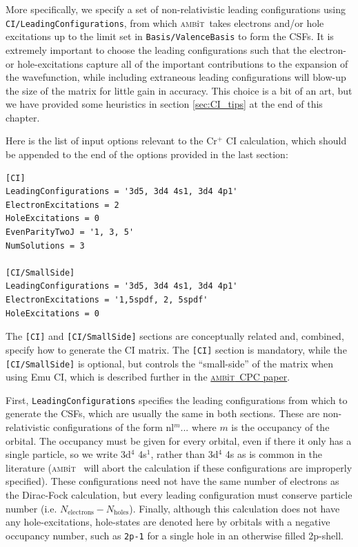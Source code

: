 \documentclass{report}
\newcommand{\ambit}{\textsc{amb}{\footnotesize i}\textsc{t}}
\begin{document}
More specifically, we specify a set of non-relativistic leading configurations using 
\texttt{CI/LeadingConfigurations}, from which \ambit\  takes electrons and/or hole excitations up to the
limit set in \texttt{Basis/ValenceBasis} to form the CSFs. It is extremely important to choose the
leading configurations such that the electron- or hole-excitations capture all of the important
contributions to the expansion of the wavefunction, while including extraneous leading configurations
will blow-up the size of the matrix for little gain in accuracy. This choice is a bit of an art, but we
have provided some heuristics in section \ref{sec:CI_tips} at the end of this chapter.

Here is the list of input options relevant to the Cr$^+$ CI calculation, which should be appended to the
end of the options provided in the last section:

\begin{verbatim}
[CI]                                                                           
LeadingConfigurations = '3d5, 3d4 4s1, 3d4 4p1'                                
ElectronExcitations = 2                                                        
HoleExcitations = 0                                                            
EvenParityTwoJ = '1, 3, 5'                                                     
NumSolutions = 3
                                                                               
[CI/SmallSide]                                                                 
LeadingConfigurations = '3d5, 3d4 4s1, 3d4 4p1'                                
ElectronExcitations = '1,5spdf, 2, 5spdf'                                      
HoleExcitations = 0 
\end{verbatim}

The \texttt{[CI]} and \texttt{[CI/SmallSide]} sections are conceptually related and, combined, specify 
how to generate the CI matrix. The \texttt{[CI]} section is mandatory, while the \texttt{[CI/SmallSide]}
is optional, but controls the ``small-side'' of the matrix when using Emu CI, which is described further
in the \href{link_goes_here}{\ambit\  CPC paper}.

First, \texttt{LeadingConfigurations} specifies the leading configurations from which to generate the 
CSFs, which are usually the
same in both sections. These are non-relativistic configurations of the form nl$^{m}...$ where $m$ is 
the occupancy of the orbital. The occupancy must be given for every orbital, even if there it only has a
single particle, so we write 3d$^4$ 4s$^1$, rather than 3d$^4$ 4s as is common in the literature (\ambit
~will abort the calculation if these configurations are improperly specified). These configurations need
not have the same number of electrons as the Dirac-Fock calculation, but every leading configuration
must conserve particle number (i.e. $N_{\mathrm{electrons}} - N_{\mathrm{holes}}$). Finally, although
this calculation does not have any hole-excitations, hole-states are denoted here by orbitals with a
negative occupancy number, such as \texttt{2p-1} for a single hole in an otherwise filled 2p-shell.
\end{document}
